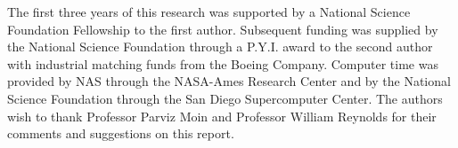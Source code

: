 %
%
%
%
%

The first three years of this research was supported by a National Science
Foundation Fellowship to the first author.  Subsequent funding was supplied by
the National Science Foundation through a P.Y.I. award to the second author
with industrial matching funds from the Boeing Company.  Computer time was
provided by NAS through the NASA-Ames Research Center and by the National
Science Foundation through the San Diego Supercomputer Center.  The authors
wish to thank Professor Parviz Moin and Professor William Reynolds for their
comments and suggestions on this report.


